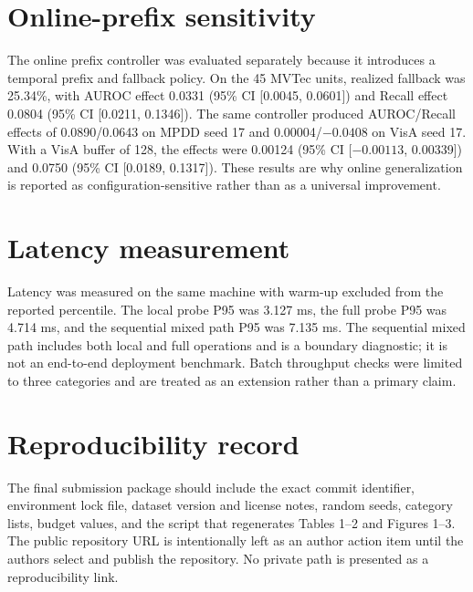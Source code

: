\documentclass[pdflatex,sn-vancouver-num]{sn-jnl}
\begin{document}
\section{Online-prefix sensitivity}
The online prefix controller was evaluated separately because it introduces a temporal prefix and fallback policy. On the 45 MVTec units, realized fallback was 25.34\%, with AUROC effect 0.0331 (95\% CI [0.0045, 0.0601]) and Recall effect 0.0804 (95\% CI [0.0211, 0.1346]). The same controller produced AUROC/Recall effects of 0.0890/0.0643 on MPDD seed 17 and 0.00004/$-0.0408$ on VisA seed 17. With a VisA buffer of 128, the effects were 0.00124 (95\% CI [$-0.00113$, 0.00339]) and 0.0750 (95\% CI [0.0189, 0.1317]). These results are why online generalization is reported as configuration-sensitive rather than as a universal improvement.

\section{Latency measurement}
Latency was measured on the same machine with warm-up excluded from the reported percentile. The local probe P95 was 3.127 ms, the full probe P95 was 4.714 ms, and the sequential mixed path P95 was 7.135 ms. The sequential mixed path includes both local and full operations and is a boundary diagnostic; it is not an end-to-end deployment benchmark. Batch throughput checks were limited to three categories and are treated as an extension rather than a primary claim.

\section{Reproducibility record}
The final submission package should include the exact commit identifier, environment lock file, dataset version and license notes, random seeds, category lists, budget values, and the script that regenerates Tables 1--2 and Figures 1--3. The public repository URL is intentionally left as an author action item until the authors select and publish the repository. No private path is presented as a reproducibility link.
\end{document}
